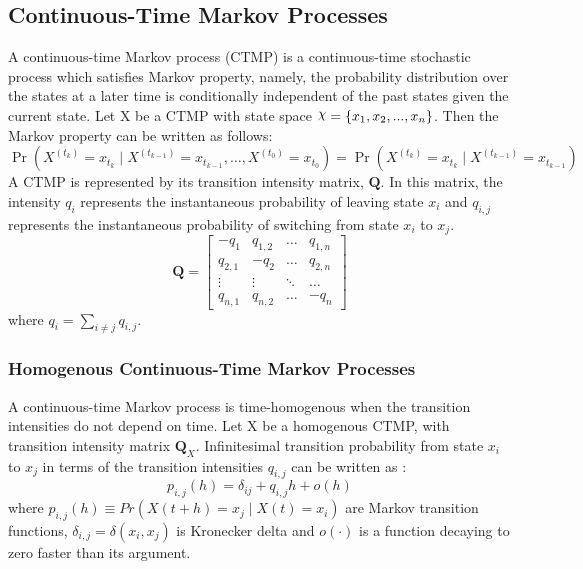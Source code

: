 \subsection{Continuous-Time Markov Processes}
A continuous-time Markov process (CTMP) is a continuous-time stochastic process which satisfies Markov property, namely, the probability distribution over the states at a later time is conditionally independent of the past states given the current state.\cite{Cohn2010a} Let X be a CTMP with state space $ \rchi = \left\lbrace x_{1}, x_{2}, ..., x_{n} \right\rbrace  $. Then the Markov property can be written as follows:
\begin{equation}
	\operatorname{Pr}\left(X^{\left(t_{k}\right)}=x_{t_{k}} \mid X^{\left(t_{k-1}\right)}=x_{t_{k-1}}, \ldots, X^{\left(t_{0}\right)}=x_{t_{0}}\right)=\operatorname{Pr}\left(X^{\left(t_{k}\right)}=x_{t_{k}} \mid X^{\left(t_{k-1}\right)}=x_{t_{k-1}}\right)
\end{equation}
A CTMP is represented by its transition intensity matrix, $ \textbf{Q} $. In this matrix, the intensity $ q_{i} $ represents the instantaneous probability of leaving state $ x_{i} $ and $ q_{i,j} $ represents the instantaneous probability of switching from state $ x_{i} $ to $ x_{j} $. 
\begin{equation}
	\textbf{Q} = 
	\begin{bmatrix}
	-q_{1} & q_{1,2} & 	{\hdots}  & q_{1,n} \\
	q_{2,1} & -q_{2} & 	{\hdots}  & q_{2,n}  \\
	{\vdots}  & 	{\vdots}  & 	{\ddots}  & {\hdots}  \\
	q_{n,1} &  q_{n,2} &  {\hdots} & -q_{n}
	\end{bmatrix}
\label{eq:Q_matrix}
\end{equation}
where $ q_{i} = \sum_{i \neq j} q_{i,j}$.\cite{Nodelman1995}

\subsubsection{Homogenous Continuous-Time Markov Processes}
A continuous-time Markov process is time-homogenous when the transition intensities do not depend on time. Let X be a homogenous CTMP, with transition intensity matrix $ \textbf{Q}_X $. Infinitesimal transition probability from state $ x_{i} $ to $ x_{j} $ in terms of the transition intensities $ q_{i,j} $ can be written as \cite{Cohn2010a}:
\begin{equation}
p_{i,j}(h)=\delta_{ij}+q_{i,j} h+o(h)
\label{eq:Markov_trans_func}
\end{equation}
where $ p_{i, j}(h) \equiv Pr(X(t+h)=x_j\mid X(t)=x_i) $ are Markov transition functions, $ \delta_{i,j} = \delta(x_i,x_j)$ is Kronecker delta and $ o(\cdot) $ is a function decaying to zero faster than its argument.

